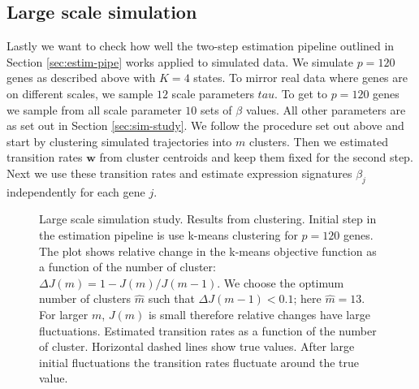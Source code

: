 \subsection{Large scale simulation}
\label{sec:large-scale-model}

Lastly we want to check how well the two-step estimation pipeline outlined in Section \ref{sec:estim-pipe} works applied to simulated data. We simulate $p=120$ genes as described above with $K=4$ states. To mirror real data where genes are on different scales, we sample $12$ scale parameters $tau$. To get to $p=120$ genes we sample from all scale parameter $10$ sets of $\beta$ values. All other parameters are as set out in Section \ref{sec:sim-study}. We follow the procedure set out above and start by clustering simulated trajectories into $m$ clusters. Then we estimated transition rates $\mathbf{w}$ from cluster centroids and keep them fixed for the second step. Next we use these transition rates and estimate expression signatures $\beta_j$ independently for each gene $j$.

\begin{figure}
  \centering
  \caption{Large scale simulation study. Results from clustering.  Initial step in the estimation pipeline is use k-means clustering for $p=120$ genes. The plot shows relative change in the k-means objective function as a function of the number of cluster: $\Delta J(m) = 1 - J(m) / J(m - 1)$. We choose the optimum number of clusters $\hat{m}$ such that $\Delta J(m - 1) < 0.1$; here $\hat{m} = 13$. For larger $m$, $J(m)$ is small therefore relative changes have large fluctuations.  Estimated transition rates as a function of the number of cluster. Horizontal dashed lines show true values. After large initial fluctuations the transition rates fluctuate around the true value.}
  \label{fig:lrg-sim-clust}
\end{figure}



